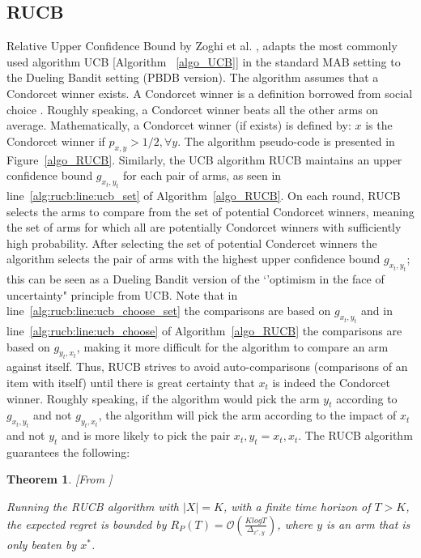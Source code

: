 \documentclass[MSc,beforeExam]{iitcsthesis}
\newtheorem{theorem}{Theorem}
\begin{document}
	\subsection{RUCB} Relative Upper Confidence Bound by Zoghi et al. \cite{zoghi2013relative}, adapts the most commonly used algorithm UCB [Algorithm~ \ref{algo_UCB}] in the standard MAB setting to the Dueling Bandit setting (PBDB version).
	The algorithm assumes that a Condorcet winner exists.
	A Condorcet winner is a definition borrowed from social choice \cite{black1948rationale}.  Roughly speaking, a Condorcet winner beats all the other arms on average. Mathematically, a Condorcet winner (if exists) is defined by: $x$ is the Condorcet winner if $ p_{x,y} > 1/2, \forall y $.
	The algorithm pseudo-code is presented in Figure~\ref{algo_RUCB}.
	Similarly, the UCB algorithm RUCB maintains an upper confidence bound $g_{x_t,y_t}$ for each pair of arms, as seen in line~\ref{alg:rucb:line:ucb_set} of Algorithm~\ref{algo_RUCB}.
	On each round, RUCB selects the arms to compare from the set of potential Condorcet winners, meaning the set of arms for which all are potentially Condorcet winners with sufficiently high probability. 
	After selecting the set of potential Condercet winners the algorithm selects the pair of arms with the highest upper confidence bound $g_{x_t,y_t}$; this can be seen as a Dueling Bandit version of the `'optimism in the face of uncertainty" principle from UCB.
	Note that in line~\ref{alg:rucb:line:ucb_choose_set} the comparisons are based on $g_{x_t,y_t}$ and in line~\ref{alg:rucb:line:ucb_choose} of Algorithm~\ref{algo_RUCB} the comparisons are based on $g_{y_t,x_t}$, making it more difficult for the algorithm to compare an arm against itself.
	Thus, RUCB strives to avoid auto-comparisons (comparisons of an item with itself) until there is great certainty that $x_t$ is indeed the Condorcet winner.
	Roughly speaking, if the algorithm would pick the arm $y_t$ according to $g_{x_t,y_t}$ and not $g_{y_t,x_t}$, the algorithm will pick the arm according to the impact of $x_t$ and not $y_t$ and is more likely to pick the pair $x_t,y_t = x_t,x_t$.
	The RUCB algorithm guarantees the following:
	\begin{theorem}\label{thm:RUCB}[From \cite{zoghi2013relative}]

		Running the RUCB algorithm with $|X|=K$, with a finite time horizon of $T>K$, the expected regret is bounded by $R_P(T) = \mathcal{O} \left( \frac{K log T}{\Delta_{x^*,y}} \right)$, where $y$ is an arm that is only beaten by $x^*$.

	\end{theorem}
	
\end{document}
